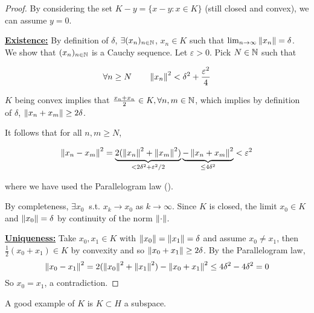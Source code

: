 \documentclass{article}
\begin{document}
\begin{proof} 
By considering the set $K-y = \{x-y: x\in K\}$ (still closed and convex), we can assume $y=0$.  

\underline{\textbf{Existence:}}\nl
By definition of $\delta$, $\exists (x_n)_{n \in \mathbb{N}}$, $x_n\in K$ such that $\lim_{n \to \infty} \left\|{x_n}\right\|=\delta$. We show that $(x_n)_{n \in \mathbb{N}}$ is a Cauchy sequence. Let $\varepsilon >0$. Pick $N \in \mathbb{N}$ such that  

$$
\forall n \geq N \qquad \left\|{x_n}\right\|^2 < \delta^2 + \frac{\varepsilon^2}{4}
$$  

$K$ being convex implies that $\frac{x_n+x_n}{2} \in K, \forall n,m \in \mathbb{N}$, which implies by definition of $\delta$, $\left\|{x_n+x_m}\right\| \geq 2\delta$.  

It follows that for all $n,m \geq N$,  

\begin{equation*}
    \left\|{x_n-x_m}\right\|^2 = \underbrace{2(\left\|{x_n}\right\|^2+\left\|{x_m}\right\|^2)}_{< 2\delta^2 + \varepsilon^2 /2} \underbrace{-\left\|{x_n+x_m}\right\|^2}_{\leq 4\delta^2} < \varepsilon^2
\end{equation*}  

where we have used the Parallelogram law ().  

By completeness, $\exists x_0 \ $ s.t. $x_k \to x_0$ as $k \to \infty$. Since $K$ is closed, the limit $x_0\in K$ and $\left\|{x_0}\right\|=\delta$ by continuity of the norm $\left\|{\cdot}\right\|$.  

\underline{\textbf{Uniqueness:}}\nl
Take $x_0, x_1 \in K$ with $\left\|{x_0}\right\|=\left\|{x_1}\right\|=\delta$ and assume $x_0\neq x_1$, then $\frac{1}{2}(x_0+x_1) \in K$ by convexity and so $\left\|{x_0+x_1}\right\|\geq 2\delta$. By the Parallelogram law,  
$$
\left\|{x_0-x_1}\right\|^2 = 2(\left\|{x_0}\right\|^2 + \left\|{x_1}\right\|^2) - \left\|{x_0+x_1}\right\|^2 \leq 4\delta^2-4\delta^2= 0
$$  
So $x_0=x_1$, a contradiction.
\end{proof}  

\begin{remark}
    A good example of $K$ is $K \subset H$ a subspace.
\end{remark}  
\end{document}
